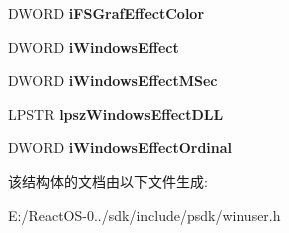 \begin{DoxyCompactItemize}
D\+W\+O\+RD {\bfseries i\+F\+S\+Graf\+Effect\+Color}
\item 
\mbox{\label{structtag_s_o_u_n_d_s_e_n_t_r_y_a_a5d7cba6fae62fe3cec0fb7cb7709875c}} 
D\+W\+O\+RD {\bfseries i\+Windows\+Effect}
\item 
\mbox{\label{structtag_s_o_u_n_d_s_e_n_t_r_y_a_aefdbc81cd4dd012d7fe70c3a785a89cf}} 
D\+W\+O\+RD {\bfseries i\+Windows\+Effect\+M\+Sec}
\item 
\mbox{\label{structtag_s_o_u_n_d_s_e_n_t_r_y_a_a17e3b7f4f9a283518d1b8abd9c81121f}} 
L\+P\+S\+TR {\bfseries lpsz\+Windows\+Effect\+D\+LL}
\item 
\mbox{\label{structtag_s_o_u_n_d_s_e_n_t_r_y_a_aff460a8220106924284a582b643e938c}} 
D\+W\+O\+RD {\bfseries i\+Windows\+Effect\+Ordinal}
\end{DoxyCompactItemize}


该结构体的文档由以下文件生成\+:\begin{DoxyCompactItemize}
\item 
E\+:/\+React\+O\+S-\/0../sdk/include/psdk/winuser.\+h\end{DoxyCompactItemize}
